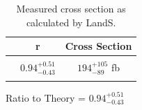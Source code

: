 \begin{table}[ht!]
\begin{center}
\caption{\small \label{tab:landsout} Measured cross section as calculated by LandS.}
\begin{tabular}{c|cc}\hline
	& r        & Cross Section	 \\ \hline
	&  & \\
\ttZ	& $0.94 _{-0.43} ^{+0.51}$ & 	$194 _{-89} ^{+105}$ fb\\
& & \\
\hline
\end{tabular}
\end{center}
\end{table}
 
 
 
 
 Ratio to Theory = $0.94 _{-0.43} ^{+0.51}$\\
	